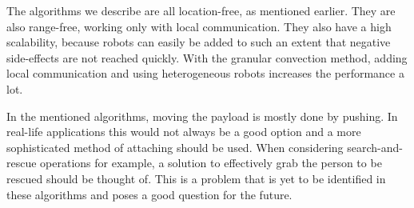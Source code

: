 The algorithms we describe are all location-free, as mentioned earlier. 
They are also range-free, working only with local communication.
They also have a high scalability, because robots can easily be added to such an extent that negative side-effects are not reached quickly.
With the granular convection method, adding local communication and using heterogeneous robots increases the performance a lot. 

  \begin{table}[H]
  \renewcommand{\arraystretch}{1.3}
  \centering
{}
    \caption{Overview of Collective Transport Algorithms}
  \label{table_alg_coltrans2}
  \end{table}



In the mentioned algorithms, moving the payload is mostly done by pushing. 
In real-life applications this would not always be a good option and a more sophisticated method of attaching should be used. 
When considering search-and-rescue operations for example, a solution to effectively grab the person to be rescued should be thought of. 
This is a problem that is yet to be identified in these algorithms and poses a good question for the future.
